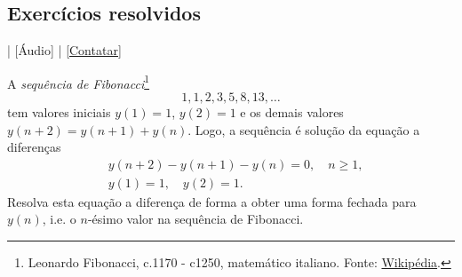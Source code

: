 \subsection*{Exercícios resolvidos}

\begin{flushright}
  [Vídeo] | [Áudio] | \href{https://phkonzen.github.io/notas/contato.html}{[Contatar]}
\end{flushright}

\begin{exeresol}
  A \emph{sequência de Fibonacci}\footnote{Leonardo Fibonacci, c.1170 - c1250, matemático italiano. Fonte: \href{https://pt.wikipedia.org/wiki/Leonardo_Fibonacci}{Wikipédia}.}
  \begin{equation}
    1, 1, 2, 3, 5, 8, 13, \ldots
  \end{equation}
  tem valores iniciais $y(1)=1$, $y(2)=1$ e os demais valores $y(n+2)=y(n+1)+y(n)$. Logo, a sequência é solução da equação a diferenças
  \begin{align}
    &y(n+2)-y(n+1)-y(n)=0,\quad n\geq 1,\\
    &y(1)=1,\quad y(2)=1.
  \end{align}
  Resolva esta equação a diferença de forma a obter uma forma fechada para $y(n)$, i.e. o $n$-ésimo valor na sequência de Fibonacci.
\end{exeresol}
